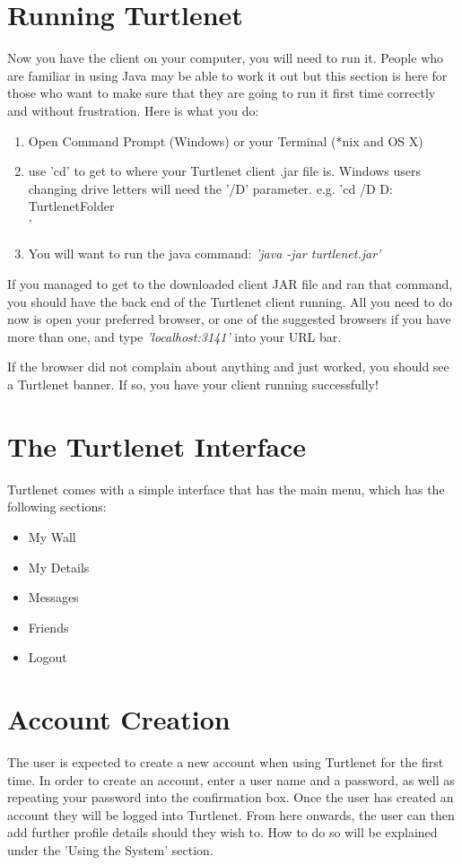 \section{Running Turtlenet}
Now you have the client on your computer, you will need to run it.  People who
are familiar in using Java may be able to work it out but this section is here
for those who want to make sure that they are going to run it first time
correctly and without frustration.  Here is what you do:
\begin{enumerate}
\item Open Command Prompt (Windows) or your Terminal (*nix and OS X)
\item use 'cd' to get to where your Turtlenet client .jar file is.
      Windows users changing drive letters will need the '/D' parameter.
      e.g. 'cd /D D:\\TurtlenetFolder\\'
\item You will want to run the java command: \newline
      \textit{'java -jar turtlenet.jar'}
\end{enumerate}

If you managed to get to the downloaded client JAR file and ran that command,
you should have the back end of the Turtlenet client running.  All you need to
do now is open your preferred browser, or one of the suggested browsers if you
have more than one, and type \textit{'localhost:3141'} into your URL bar.

If the browser did not complain about anything and just worked, you should see
a Turtlenet banner.  If so, you have your client running successfully!

\section{The Turtlenet Interface}
Turtlenet comes with a simple interface that has the main menu, which has the
following sections:
\begin{itemize}
\item My Wall
\item My Details
\item Messages
\item Friends
\item Logout
\end{itemize}

\section{Account Creation}
The user is expected to create a new account when using Turtlenet for the first
time.  In order to create an account, enter a user name and a password, as well
as repeating your password into the confirmation box.  Once the user has 
created an account they will be logged into Turtlenet.  From here onwards, the
user can then add further profile details should they wish to. How to do so will
be explained under the 'Using the System' section.
